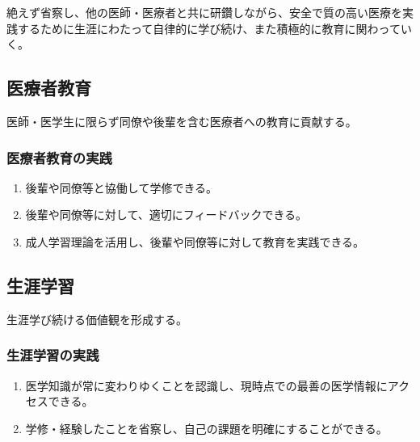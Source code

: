 絶えず省察し、他の医師・医療者と共に研鑽しながら、安全で質の高い医療を実践するために生涯にわたって自律的に学び続け、また積極的に教育に関わっていく。

\hypertarget{ux533bux7642ux8005ux6559ux80b2}{%
\subsection{医療者教育}\label{ux533bux7642ux8005ux6559ux80b2}}

医師・医学生に限らず同僚や後輩を含む医療者への教育に貢献する。

\hypertarget{ux533bux7642ux8005ux6559ux80b2ux306eux5b9fux8df5}{%
\subsubsection{医療者教育の実践}\label{ux533bux7642ux8005ux6559ux80b2ux306eux5b9fux8df5}}

\begin{enumerate}
\def\labelenumi{\arabic{enumi}.}
\tightlist
\item
  後輩や同僚等と協働して学修できる。
\item
  後輩や同僚等に対して、適切にフィードバックできる。
\item
  成人学習理論を活用し、後輩や同僚等に対して教育を実践できる。
\end{enumerate}

\hypertarget{ux751fux6dafux5b66ux7fd2}{%
\subsection{生涯学習}\label{ux751fux6dafux5b66ux7fd2}}

生涯学び続ける価値観を形成する。

\hypertarget{ux751fux6dafux5b66ux7fd2ux306eux5b9fux8df5}{%
\subsubsection{生涯学習の実践}\label{ux751fux6dafux5b66ux7fd2ux306eux5b9fux8df5}}

\begin{enumerate}
\def\labelenumi{\arabic{enumi}.}
\tightlist
\item
  医学知識が常に変わりゆくことを認識し、現時点での最善の医学情報にアクセスできる。
\item
  学修・経験したことを省察し、自己の課題を明確にすることができる。
\end{enumerate}

